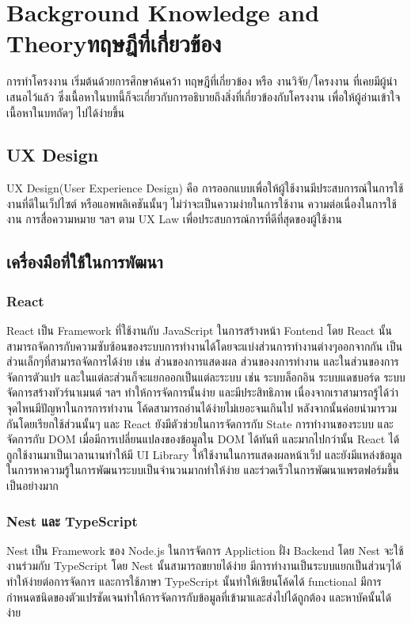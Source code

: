 \chapter{\ifenglish Background Knowledge and Theory\else ทฤษฎีที่เกี่ยวข้อง\fi}

การทำโครงงาน เริ่มต้นด้วยการศึกษาค้นคว้า ทฤษฎีที่เกี่ยวข้อง หรือ งานวิจัย/โครงงาน ที่เคยมีผู้นำเสนอไว้แล้ว ซึ่งเนื้อหาในบทนี้ก็จะเกี่ยวกับการอธิบายถึงสิ่งที่เกี่ยวข้องกับโครงงาน เพื่อให้ผู้อ่านเข้าใจเนื้อหาในบทถัดๆ ไปได้ง่ายขึ้น

\section{UX Design}
UX Design(User Experience Design) คือ การออกแบบเพื่อให้ผู้ใช้งานมีประสบการณ์ในการใช้งานที่ดีในเว็ปไซต์ หรือแอพพลิเคชันนั้นๆ
ไม่ว่าจะเป็นความง่ายในการใช้งาน ความต่อเนื่องในการใช้งาน การสื่อความหมาย ฯลฯ ตาม UX Law\cite{uxlaw} เพื่อประสบการณ์การที่ดีที่สุดของผู้ใช้งาน

\section{เครื่องมือที่ใช้ในการพัฒนา}
\subsection{React}
React เป็น Framework ที่ใช้งานกับ JavaScript ในการสร้างหน้า Fontend โดย React นั้นสามารถจัดการกับความซับซ้อนของระบบการทำงานได้โดยจะแบ่งส่วนการทำงานต่างๆออกจากกัน
เป็นส่วนเล็กๆที่สามารถจัดการได้ง่าย เช่น ส่วนของการแสดงผล ส่วนของงการทำงาน และในส่วนของการจัดการตัวแปร และในแต่ละส่วนก็จะแยกออกเป็นแต่ละระบบ เช่น ระบบล็อกอิน ระบบแดชบอร์ด ระบบจัดการสร้างทัวร์นาเมนต์ ฯลฯ 
ทำให้การจัดการนั้นง่าย และมีประสิทธิภาพ เนื่องจากเราสามารถรู้ได้ว่าจุดไหนมีปัญหาในการการทำงาน โค้ดสามารถอ่านได้ง่ายไม่เยอะจนเกินไป หลังจากนั้นค่อยนำมารวมกันโดยเรียกใช้ส่วนนั้นๆ และ React ยังมีตัวช่วยในการจัดการกับ State การทำงานของระบบ และจัดการกับ DOM
เมื่อมีการเปลี่ยนแปลงของข้อมูลใน DOM ได้ทันที และมากไปกว่านั้น React ได้ถูกใช้งานมาเป็นเวลานานทำให้มี UI Library ให้ใช้งานในการแสดงผลหน้าเว็ป และยังมีแหล่งข้อมูลในการหาความรู้ในการพัฒนาระบบเป็นจำนวนมากทำให้ง่าย และร่วดเร็วในการพัฒนาแพรตฟอร์มขึ้นเป็นอย่างมาก 

\subsection{Nest และ TypeScript}
Nest เป็น Framework ของ Node.js ในการจัดการ Appliction ฝั่ง Backend โดย Nest จะใช้งานร่วมกับ TypeScript 
โดย Nest นั้นสามารถขยายได้ง่าย มีการทำงานเป็นระบบแยกเป็นส่วนๆได้ ทำให้ง่ายต่อการจัดการ และการใช้ภาษา TypeScript นั้นทำให้เขียนโค้ดได้
functional มีการกำหนดชนิดของตัวแปรชัดเจนทำให้การจัดการกับข้อมูลที่เข้ามาและส่งไปได้ถูกต้อง และหาบัคนั้นได้ง่าย

